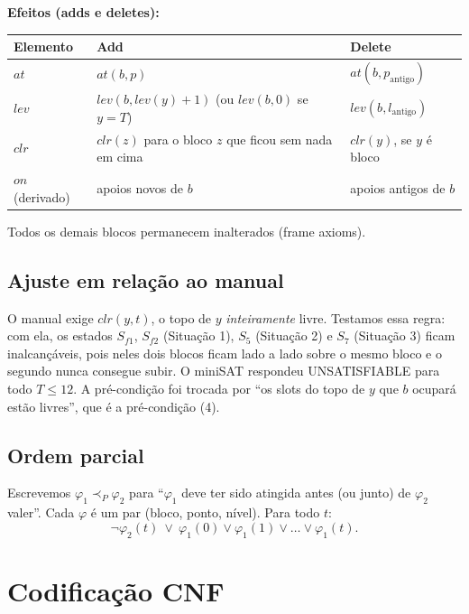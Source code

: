 \documentclass[11pt,a4paper]{article}
\newcommand{\at}{\mathit{at}}
\newcommand{\lev}{\mathit{lev}}
\newcommand{\clr}{\mathit{clr}}
\newcommand{\on}{\mathit{on}}
\begin{document}
\textbf{Efeitos (adds e deletes):}
\begin{center}
\begin{tabular}{lll}
\toprule
Elemento & Add & Delete\\
\midrule
$\at$ & $\at(b,p)$ & $\at(b,p_{\text{antigo}})$\\
$\lev$ & $\lev(b,\lev(y)+1)$ (ou $\lev(b,0)$ se $y=T$) & $\lev(b,l_{\text{antigo}})$\\
$\clr$ & $\clr(z)$ para o bloco $z$ que ficou sem nada em cima & $\clr(y)$, se $y$ \'e bloco\\
$\on$ (derivado) & apoios novos de $b$ & apoios antigos de $b$\\
\bottomrule
\end{tabular}
\end{center}
Todos os demais blocos permanecem inalterados (frame axioms).

\subsection{Ajuste em rela\c{c}\~ao ao manual}
O manual exige $\clr(y,t)$, o topo de $y$ \emph{inteiramente} livre. Testamos essa regra: com ela, os estados $S_{f1}$, $S_{f2}$ (Situa\c{c}\~ao 1), $S_5$ (Situa\c{c}\~ao 2) e $S_7$ (Situa\c{c}\~ao 3) ficam inalcan\c{c}\'aveis, pois neles dois blocos ficam lado a lado sobre o mesmo bloco e o segundo nunca consegue subir. O miniSAT respondeu UNSATISFIABLE para todo $T\le 12$. A pr\'e-condi\c{c}\~ao foi trocada por ``os slots do topo de $y$ que $b$ ocupar\'a est\~ao livres'', que \'e a pr\'e-condi\c{c}\~ao (4).

\subsection{Ordem parcial}
Escrevemos $\varphi_1\prec_P\varphi_2$ para ``$\varphi_1$ deve ter sido atingida antes (ou junto) de $\varphi_2$ valer''. Cada $\varphi$ \'e um par (bloco, ponto, n\'ivel). Para todo $t$:
\[
\neg\varphi_2(t)\ \vee\ \varphi_1(0)\vee\varphi_1(1)\vee\dots\vee\varphi_1(t).
\]

\section{Codifica\c{c}\~ao CNF}
\end{document}
